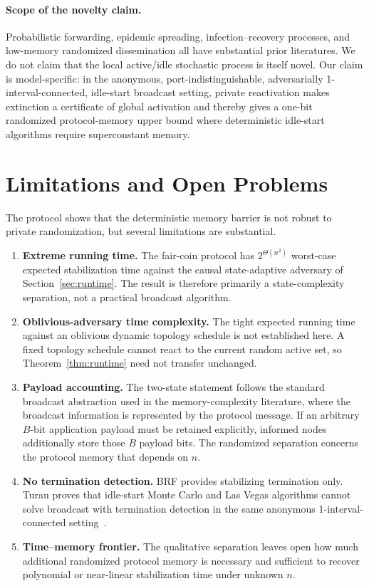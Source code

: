 \documentclass[11pt]{article}
\newcommand{\BRF}{\textsc{BRF}}
\begin{document}
\paragraph{Scope of the novelty claim.}
Probabilistic forwarding, epidemic spreading, infection--recovery processes, and low-memory randomized dissemination all have substantial prior literatures. We do not claim that the local active/idle stochastic process is itself novel. Our claim is model-specific: in the anonymous, port-indistinguishable, adversarially 1-interval-connected, idle-start broadcast setting, private reactivation makes extinction a certificate of global activation and thereby gives a one-bit randomized protocol-memory upper bound where deterministic idle-start algorithms require superconstant memory.

\section{Limitations and Open Problems}

The protocol shows that the deterministic memory barrier is not robust to private randomization, but several limitations are substantial.

\begin{enumerate}[leftmargin=1.8em]
  \item \textbf{Extreme running time.} The fair-coin protocol has $2^{\Theta(n^2)}$ worst-case expected stabilization time against the causal state-adaptive adversary of Section~\ref{sec:runtime}. The result is therefore primarily a state-complexity separation, not a practical broadcast algorithm.

  \item \textbf{Oblivious-adversary time complexity.} The tight expected running time against an oblivious dynamic topology schedule is not established here. A fixed topology schedule cannot react to the current random active set, so Theorem~\ref{thm:runtime} need not transfer unchanged.

  \item \textbf{Payload accounting.} The two-state statement follows the standard broadcast abstraction used in the memory-complexity literature, where the broadcast information is represented by the protocol message. If an arbitrary $B$-bit application payload must be retained explicitly, informed nodes additionally store those $B$ payload bits. The randomized separation concerns the protocol memory that depends on $n$.

  \item \textbf{No termination detection.} \BRF{} provides stabilizing termination only. Turau proves that idle-start Monte Carlo and Las Vegas algorithms cannot solve broadcast with termination detection in the same anonymous 1-interval-connected setting~\cite{Turau2026}.

  \item \textbf{Time--memory frontier.} The qualitative separation leaves open how much additional randomized protocol memory is necessary and sufficient to recover polynomial or near-linear stabilization time under unknown $n$.
\end{enumerate}
\end{document}

